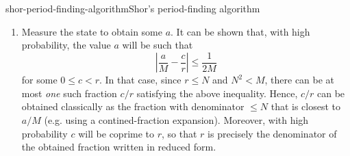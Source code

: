 \begin{topic}{shor-period-finding-algorithm}{Shor's period-finding algorithm}
\begin{enumerate}[label=(\arabic*)]
\[\begin{cases}
        \end{cases} \]
        \item Measure the state to obtain some $a$. It can be shown that, with high probability, the value $a$ will be such that
        \[ \left| \frac{a}{M} - \frac{c}{r} \right| \le \frac{1}{2 M} \]
        for some $0 \le c < r$. In that case, since $r \le N$ and $N^2 < M$, there can be at most \textit{one} such fraction $c/r$ satisfying the above inequality. Hence, $c/r$ can be obtained classically as the fraction with denominator $\le N$ that is closest to $a / M$ (e.g. using a contined-fraction expansion). Moreover, with high probability $c$ will be coprime to $r$, so that $r$ is precisely the denominator of the obtained fraction written in reduced form.
    \end{enumerate}
\end{topic}

